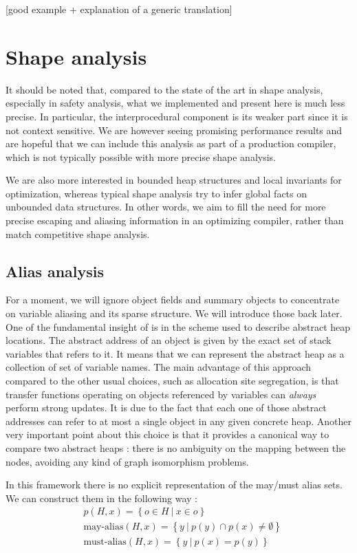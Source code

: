 \documentclass[11pt]{article}
\begin{document}
[good example + explanation of a generic translation]

\section*{Shape analysis}

It should be noted that, compared to the state of the art in shape analysis, especially in safety analysis, what we implemented and present here is much less precise.
In particular, the interprocedural component is its weaker part since it is not context sensitive.
We are however seeing promising performance results and are hopeful that we can include this analysis as part of a production compiler, which is not typically possible with more precise shape analysis.

We are also more interested in bounded heap structures and local invariants for optimization, whereas typical shape analysis try to infer global facts on unbounded data structures. In other words, we aim to fill the need for more precise escaping and aliasing information in an optimizing compiler, rather than match competitive shape analysis.

\subsection*{Alias analysis}
For a moment, we will ignore object fields and summary objects to concentrate on variable aliasing and its sparse structure. We will introduce those back later.
One of the fundamental insight of \cite{ssc} is in the scheme used to describe abstract heap locations.
The abstract address of an object is given by the exact set of stack variables that refers to it.
It means that we can represent the abstract heap as a collection of set of variable names.
The main advantage of this approach compared to the other usual choices, such as allocation site segregation, is that transfer functions operating on objects referenced by variables can \emph{always} perform strong updates.
It is due to the fact that each one of those abstract addresses can refer to at most a single object in any given concrete heap.
Another very important point about this choice is that it provides a canonical way to compare two abstract heaps : there is no ambiguity on the mapping between the nodes, avoiding any kind of graph isomorphism problems.

In this framework there is no explicit representation of the may/must alias sets.
We can construct them in the following way :
\begin{align*}
& p(H,x) = \left\{ o \in H ~|~ x \in o \right\} \\
& \text{may-alias}(H,x) = \left\{ y~|~ p(y)\cap p(x) \neq \emptyset \right\} \\
& \text{must-alias}(H,x) = \left\{ y~|~ p(x) = p(y) \right\}
\end{align*}
\end{document}
